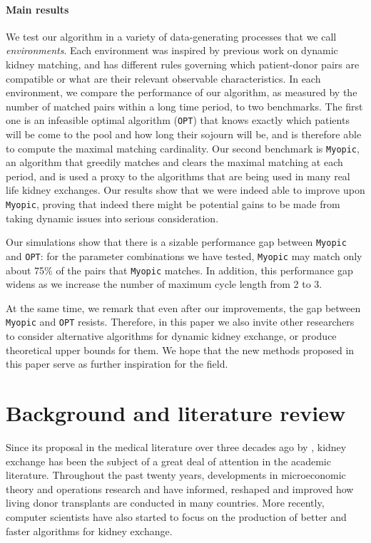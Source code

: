 \documentclass[12pt]{article}
\begin{document}
\paragraph{Main results} We test our algorithm in a variety of data-generating processes that we call \emph{environments}. Each environment was inspired by previous work on dynamic kidney matching, and has different rules governing which patient-donor pairs are compatible or what are their relevant observable characteristics. In each environment, we compare the performance of our algorithm, as measured by the number of matched pairs within a long time period, to two benchmarks. The first one is an infeasible optimal algorithm (\texttt{OPT}) that knows exactly which patients will be come to the pool and how long their sojourn will be, and is therefore able to compute the maximal matching cardinality. Our second benchmark is \texttt{Myopic}, an algorithm that greedily matches and clears the maximal matching at each period, and is used a proxy to the algorithms that are being used in many real life kidney exchanges. Our results show that we were indeed able to improve upon \texttt{Myopic}, proving that indeed there might be potential gains to be made from taking dynamic issues into serious consideration. 

Our simulations show that there is a sizable performance gap between \texttt{Myopic} and \texttt{OPT}: for the parameter combinations we have tested, \texttt{Myopic} may match only about 75\% of the pairs that \texttt{Myopic} matches. In addition, this performance gap widens as we increase the number of maximum cycle length from 2 to 3. 

At the same time, we remark that even after our improvements, the gap between \texttt{Myopic} and \texttt{OPT} resists. Therefore, in this paper we also invite other researchers to consider alternative algorithms for dynamic kidney exchange, or produce theoretical upper bounds for them. We hope that the new methods proposed in this paper serve as further inspiration for the field.


\section{Background and literature review} \label{sec:literature}

Since its proposal in the medical literature over three decades ago by \cite{rapaport1986case}, kidney exchange has been the subject of a great deal of attention in the academic literature. Throughout the past twenty years, developments in microeconomic theory and operations research and have informed, reshaped and improved how living donor transplants are conducted in many countries. More recently, computer scientists have also started to focus on the production of better and faster algorithms for kidney exchange.
\end{document}
